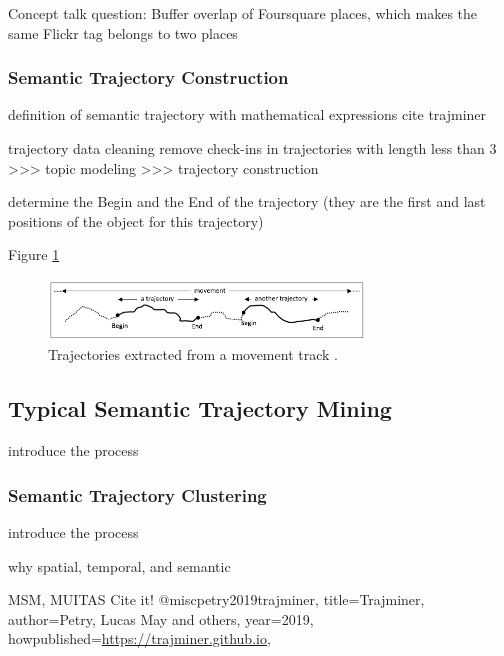 \documentclass{article}
\begin{document}
Concept talk question: Buffer overlap of Foursquare places, which makes the same Flickr tag belongs to two places

\subsubsection{Semantic Trajectory Construction}
definition of semantic trajectory with mathematical expressions
cite trajminer

trajectory data cleaning
remove check-ins in trajectories with length less than 3 >>> topic modeling >>> trajectory construction

determine the Begin and the End of the trajectory (they are the first and last positions of the object for this trajectory)

Figure \ref{fig:trajectory_begin_end}
\begin{figure}
\centering
\includegraphics[width=0.75\textwidth]{figures/begin_end.png}
\caption{\label{fig:trajectory_begin_end}Trajectories extracted from a movement track \citep{parent_semantic_2013}.}
\end{figure}


\subsection{Typical Semantic Trajectory Mining} \label{typical_semantic_trajectory_mining}
introduce the process

\subsubsection{Semantic Trajectory Clustering}
introduce the process

why spatial, temporal, and semantic


MSM, MUITAS
Cite it!
@misc{petry2019trajminer,
  title={Trajminer},
  author={Petry, Lucas May and others},
  year={2019},
  howpublished={\url{https://trajminer.github.io}},
}
\end{document}
